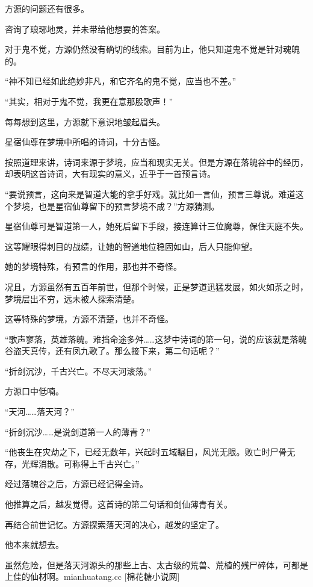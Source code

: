 
\begin{this_body}

方源的问题还有很多。

咨询了琅琊地灵，并未带给他想要的答案。

对于鬼不觉，方源仍然没有确切的线索。目前为止，他只知道鬼不觉是针对魂魄的。

“神不知已经如此绝妙非凡，和它齐名的鬼不觉，应当也不差。”

“其实，相对于鬼不觉，我更在意那股歌声！”

每每想到这里，方源就下意识地皱起眉头。

星宿仙尊在梦境中所唱的诗词，十分古怪。

按照道理来讲，诗词来源于梦境，应当和现实无关。但是方源在落魄谷中的经历，却表明这首诗词，大有现实的意义，近乎于一首预言诗。

“要说预言，这向来是智道大能的拿手好戏。就比如一言仙，预言三尊说。难道这个梦境，也是星宿仙尊留下的预言梦境不成？”方源猜测。

星宿仙尊可是智道第一人，她死后留下手段，接连算计三位魔尊，保住天庭不失。

这等耀眼得刺目的战绩，让她的智道地位稳固如山，后人只能仰望。

她的梦境特殊，有预言的作用，那也并不奇怪。

况且，方源虽然有五百年前世，但那个时候，正是梦道迅猛发展，如火如荼之时，梦境层出不穷，远未被人探索清楚。

这等特殊的梦境，方源不清楚，也并不奇怪。

“歌声寥落，英雄落魄。难挡命途多舛……这梦中诗词的第一句，说的应该就是落魄谷盗天真传，还有凤九歌了。那么接下来，第二句话呢？”

“折剑沉沙，千古兴亡。不尽天河滚荡。”

方源口中低喃。

“天河……落天河？”

“折剑沉沙……是说剑道第一人的薄青？”

“他丧生在灾劫之下，已经无数年，兴起时五域瞩目，风光无限。败亡时尸骨无存，光辉消散。可称得上千古兴亡。”

经过落魄谷之后，方源已经记得全诗。

他推算之后，越发觉得。这首诗的第二句话和剑仙薄青有关。

再结合前世记忆。方源探索落天河的决心，越发的坚定了。

他本来就想去。

虽然危险，但是落天河源头的那些上古、太古级的荒兽、荒植的残尸碎体，可都是上佳的仙材啊。mianhuatang.cc [棉花糖小说网]


\end{this_body}
